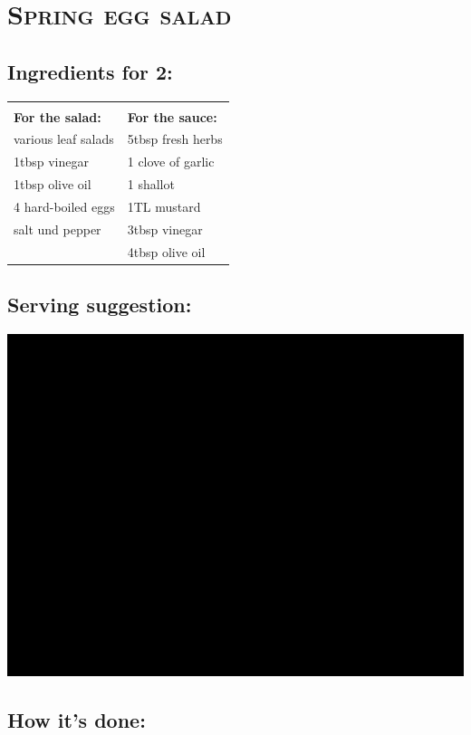 \section{\textsc{Spring egg salad}}

\subsection*{Ingredients for 2:}

\begin{tabular}{p{7.5cm} p{7.5cm}}
	& \\
	\textbf{For the salad:} & \textbf{For the sauce:} \\
	various leaf salads & 5tbsp fresh herbs \\
	1tbsp vinegar & 1 clove of garlic \\
	1tbsp olive oil & 1 shallot \\
	4 hard-boiled eggs & 1TL mustard \\
	salt und pepper & 3tbsp vinegar \\
	& 4tbsp olive oil
\end{tabular}

\subsection*{Serving suggestion:}

\includegraphics[width=\textwidth]{img/ph.jpg} \cite{fruehlingeiersalat}

\subsection*{How it's done:}

